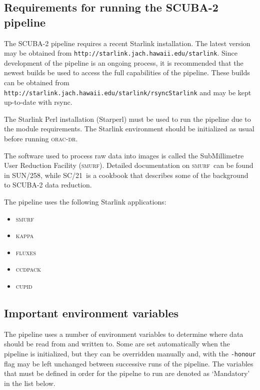 \documentclass[twoside,11pt]{article}
\newcommand{\htmladdnormallink}[2]{#1}
\newcommand{\xref}[3]{#1}
\renewcommand{\_}{\texttt{\symbol{95}}}
\newcommand{\CCDPACK}{\textsc{ccdpack}}
\newcommand{\CUPID}{\textsc{cupid}}
\newcommand{\FLUXES}{\textsc{fluxes}}
\newcommand{\KAPPA}{\textsc{kappa}}
\newcommand{\SMURF}{\textsc{smurf}}
\newcommand{\SMURFcook}{\xref{SC/21}{sc21}{}}
\newcommand{\SMURFsun}{\xref{SUN/258}{sun258}{}}
\newcommand{\oracdr}{\textsc{orac-dr}}
\begin{document}
\subsection{Requirements for running the SCUBA-2 pipeline}

The SCUBA-2 pipeline requires a recent Starlink installation. The
latest version may be obtained from
\htmladdnormallink{\texttt{http://starlink.jach.hawaii.edu/starlink}}{http://starlink.jach.hawaii.edu/starlink}. Since
development of the pipeline is an ongoing process, it is recommended
that the newest builds be used to access the full capabilities of the
pipeline. These builds can be obtained from\\
\htmladdnormallink{\texttt{http://starlink.jach.hawaii.edu/starlink/rsyncStarlink}}{http://starlink.jach.hawaii.edu/starlink/rsyncStarlink}
and may be kept up-to-date with rsync.

The Starlink Perl installation (Starperl) must be used to run the
pipeline due to the module requirements. The Starlink environment should be
initialized as usual before running \oracdr.

The software used to process raw data into images is called the
SubMillimetre User Reduction Facility (\SMURF). Detailed documentation
on \SMURF\ can be found in \SMURFsun, while \SMURFcook\ is a cookbook
that describes some of the background to SCUBA-2 data reduction.

The pipeline uses the following Starlink applications:
\begin{itemize}
\item \SMURF
\item \KAPPA
\item \FLUXES
\item \CCDPACK
\item \CUPID
\end{itemize}

\subsection{Important environment variables}

The pipeline uses a number of environment variables to determine where
data should be read from and written to. Some are set automatically
when the pipeline is initialized, but they can be overridden manually
and, with the \verb+-honour+ flag may be left unchanged between
successive runs of the pipeline. The variables that must be defined in
order for the pipelne to run are denoted as `Mandatory' in the list
below.
\end{document}
